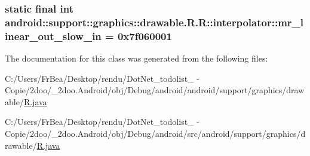 \hypertarget{classandroid_1_1support_1_1graphics_1_1drawable_1_1_r_1_1interpolator_758fc9667b9fde3de4bb12963f60d626}{
\subsubsection[{mr\_\-linear\_\-out\_\-slow\_\-in}]{\setlength{\rightskip}{0pt plus 5cm}static final int android::support::graphics::drawable.R.R::interpolator::mr\_\-linear\_\-out\_\-slow\_\-in = 0x7f060001}}
\label{classandroid_1_1support_1_1graphics_1_1drawable_1_1_r_1_1interpolator_758fc9667b9fde3de4bb12963f60d626}




The documentation for this class was generated from the following files:\begin{CompactItemize}
\item 
C:/Users/FrBea/Desktop/rendu/DotNet\_\-todolist\_ - Copie/2doo/\_\-2doo.Android/obj/Debug/android/android/support/graphics/drawable/\hyperlink{android_2support_2graphics_2drawable_2_r_8java}{R.java}\item 
C:/Users/FrBea/Desktop/rendu/DotNet\_\-todolist\_ - Copie/2doo/\_\-2doo.Android/obj/Debug/android/src/android/support/graphics/drawable/\hyperlink{src_2android_2support_2graphics_2drawable_2_r_8java}{R.java}\end{CompactItemize}
